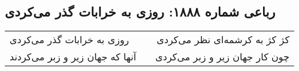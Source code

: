 \begin{center}
\section*{رباعی شماره ۱۸۸۸: روزی به خرابات گذر می‌کردی}
\label{sec:1888}
\begin{longtable}{l p{0.5cm} r}
روزی به خرابات گذر می‌کردی
&&
کژ کژ به کرشمه‌ای نظر می‌کردی
\\
آنها که جهان زیر و زبر می‌کردند
&&
چون کار جهان زیر و زبر می‌کردی
\\
\end{longtable}
\end{center}
